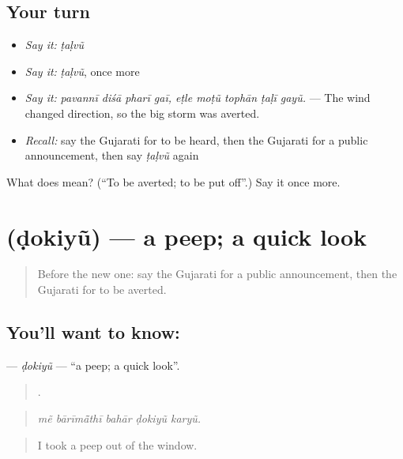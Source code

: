 \subsection*{Your turn}
\begin{itemize}
\raggedright
  \item \emph{Say it:} \emph{ṭaḷvũ}
  \item \emph{Say it:} \emph{ṭaḷvũ}, once more
  \item \emph{Say it:} \emph{pavannī diśā pharī gaī, eṭle moṭũ tophān ṭaḷī gayũ.} — The wind changed direction, so the big storm was averted.
  \item \emph{Recall:} say the Gujarati for to be heard, then the Gujarati for a public announcement, then say \emph{ṭaḷvũ} again
\end{itemize}

\begin{tcolorbox}[breakable,colback=teal!4,colframe=teal!35!black,title={Before you move on}]
What does  mean? (\textquotedblleft{}To be averted; to be put off\textquotedblright{}.) Say it once more.
\end{tcolorbox}
\section[\texorpdfstring{\gu{ડોકિયું} (ḍokiyũ)}{ડોકિયું (ḍokiyũ)}]{ (ḍokiyũ) — a peep; a quick look}

\label{lesson:GU-C399-dokiyu}



\begin{quote}
Before the new one: say the Gujarati for a public announcement, then the Gujarati for to be averted.
\end{quote}

\subsection*{You'll want to know: }
\textbf{} — \emph{ḍokiyũ} — \textquotedblleft{}a peep; a quick look\textquotedblright{}.

\begin{quote}
    .
\end{quote}

\begin{quote}
\emph{mẽ bārīmā̃thī bahār ḍokiyũ karyũ.}
\end{quote}

\begin{quote}
I took a peep out of the window.
\end{quote}

